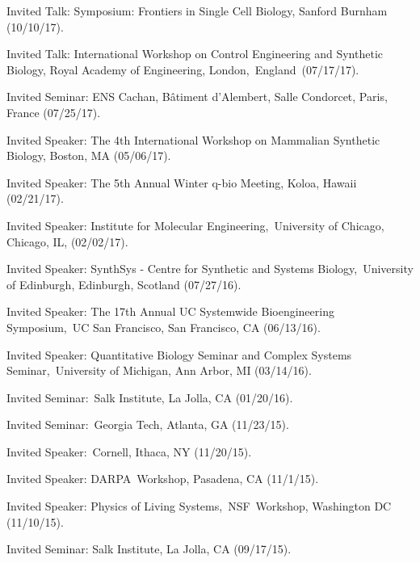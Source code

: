 \item Invited Talk: Symposium: Frontiers in Single Cell Biology, Sanford Burnham (10/10/17).

\item Invited Talk: International Workshop on Control Engineering and Synthetic Biology,  Royal Academy of Engineering, London,~England~(07/17/17).

\item Invited Seminar: ENS Cachan, Bâtiment d'Alembert, Salle Condorcet, Paris, France (07/25/17).

\item Invited Speaker: The 4th International Workshop on Mammalian Synthetic Biology, Boston, MA (05/06/17).

\item Invited Speaker: The 5th Annual Winter q-bio Meeting, Koloa, Hawaii (02/21/17).

\item Invited Speaker: Institute for Molecular Engineering, University of Chicago, Chicago, IL, (02/02/17).

\item Invited Speaker: SynthSys - Centre for Synthetic and Systems Biology,~University of Edinburgh, Edinburgh, Scotland (07/27/16).

\item Invited Speaker: The 17th Annual UC Systemwide Bioengineering Symposium,~UC San Francisco, San Francisco, CA (06/13/16).

\item Invited Speaker: Quantitative Biology Seminar and Complex Systems Seminar,~University of Michigan, Ann Arbor, MI (03/14/16).

\item Invited Seminar:~Salk Institute, La Jolla, CA (01/20/16).

\item Invited Seminar:~Georgia Tech, Atlanta, GA (11/23/15).

\item Invited Speaker:~Cornell, Ithaca, NY (11/20/15).

\item Invited Speaker: DARPA Workshop, Pasadena, CA (11/1/15).

\item Invited Speaker: Physics of Living Systems, NSF Workshop, Washington DC (11/10/15).

\item Invited Seminar: Salk Institute, La Jolla, CA (09/17/15).

